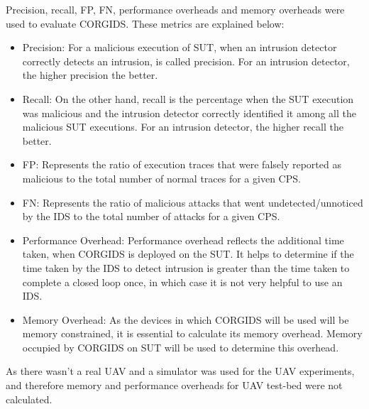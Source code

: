 Precision, recall, \ac{FP}, \ac{FN}, performance overheads and memory overheads were used to evaluate \ac{CORGIDS}. These metrics are explained below:

\begin{itemize}
\item Precision: For a malicious execution of \ac{SUT}, when an intrusion detector correctly detects an intrusion, is called precision. For an intrusion detector, the higher precision the better.
\item Recall: On the other hand, recall is the percentage when the \ac{SUT} execution was malicious and the intrusion detector correctly identified it among all the malicious \ac{SUT} executions. For an intrusion detector, the higher recall the better.
\item \acf{FP}: Represents the ratio of execution traces that were falsely reported as malicious to the total number of normal traces for a given \ac{CPS}.
\item \acf{FN}: Represents the ratio of malicious attacks that went undetected/unnoticed by the IDS to the total number of attacks for a given \ac{CPS}.
\item Performance Overhead: Performance overhead reflects the additional time taken, when \ac{CORGIDS} is deployed on the \ac{SUT}. It helps to determine if the time taken by the \ac{IDS} to detect intrusion is greater than the time taken to complete a closed loop once, in which case it is not very helpful to use an \ac{IDS}.
\item Memory Overhead: As the devices in which \ac{CORGIDS} will be used will be memory constrained, it is essential to calculate its memory overhead. Memory occupied by \ac{CORGIDS} on \ac{SUT} will be used to determine this overhead.
\end{itemize}

As there wasn't a real \ac{UAV} and a simulator was used for the \ac{UAV} experiments, and therefore memory and performance overheads for \ac{UAV} test-bed were not calculated.

\begin{table}
\centering
  \caption{False Positive and False Negative obtained for CORGIDS on the two test-beds}
  \label{tab:results}
\end{table}


